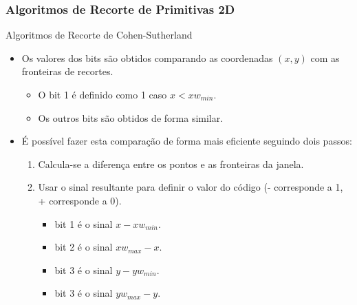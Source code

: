 \documentclass{beamer}
\begin{document}
\begin{frame}
\frametitle{Algoritmos de Recorte de Primitivas 2D}

	\begin{block}{Algoritmos de Recorte de Cohen-Sutherland}
		\begin{itemize}
			\item<1-> Os valores dos bits são obtidos comparando as coordenadas $(x,y)$ com as fronteiras de recortes.
			\begin{itemize}
				\item O bit 1 é definido como 1 caso $x < xw_{min}$.
				\item Os outros bits são obtidos de forma similar.
			\end{itemize}
			\item<2-> É possível fazer esta comparação de forma mais eficiente seguindo dois passos:
				\begin{enumerate}
					\item Calcula-se a diferença entre os pontos e as fronteiras da janela.
					\item Usar o sinal resultante para definir o valor do código (- corresponde a 1, + corresponde a 0).
					\begin{itemize}
						\item bit 1 é o sinal $x-xw_{min}$.
						\item bit 2 é o sinal $xw_{max} - x$.
						\item bit 3 é o sinal $y - yw_{min}$.
						\item bit 3 é o sinal $yw_{max} - y$.
					\end{itemize}
				\end{enumerate}
		\end{itemize}
	\end{block}
\end{frame}
\end{document}
